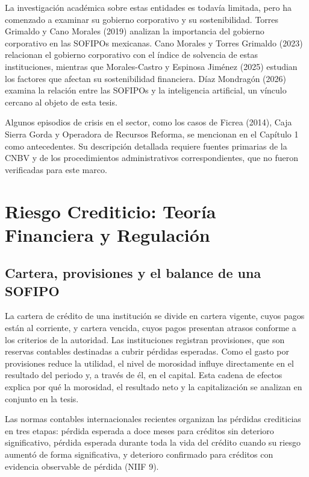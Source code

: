 La investigación académica sobre estas entidades es todavía limitada, pero ha comenzado a examinar su gobierno corporativo y su sostenibilidad. Torres Grimaldo y Cano Morales (2019) analizan la importancia del gobierno corporativo en las SOFIPOs mexicanas. Cano Morales y Torres Grimaldo (2023) relacionan el gobierno corporativo con el índice de solvencia de estas instituciones, mientras que Morales-Castro y Espinosa Jiménez (2025) estudian los factores que afectan su sostenibilidad financiera. Díaz Mondragón (2026) examina la relación entre las SOFIPOs y la inteligencia artificial, un vínculo cercano al objeto de esta tesis.%

Algunos episodios de crisis en el sector, como los casos de Ficrea (2014), Caja Sierra Gorda y Operadora de Recursos Reforma, se mencionan en el Capítulo 1 como antecedentes. Su descripción detallada requiere fuentes primarias de la CNBV y de los procedimientos administrativos correspondientes, que no fueron verificadas para este marco.%

\section{Riesgo Crediticio: Teoría Financiera y Regulación}\label{sec:riesgo}

\subsection{Cartera, provisiones y el balance de una SOFIPO}
La cartera de crédito de una institución se divide en cartera vigente, cuyos pagos están al corriente, y cartera vencida, cuyos pagos presentan atrasos conforme a los criterios de la autoridad. Las instituciones registran provisiones, que son reservas contables destinadas a cubrir pérdidas esperadas. Como el gasto por provisiones reduce la utilidad, el nivel de morosidad influye directamente en el resultado del periodo y, a través de él, en el capital. Esta cadena de efectos explica por qué la morosidad, el resultado neto y la capitalización se analizan en conjunto en la tesis.

Las normas contables internacionales recientes organizan las pérdidas crediticias en tres etapas: pérdida esperada a doce meses para créditos sin deterioro significativo, pérdida esperada durante toda la vida del crédito cuando su riesgo aumentó de forma significativa, y deterioro confirmado para créditos con evidencia observable de pérdida (NIIF 9).%

